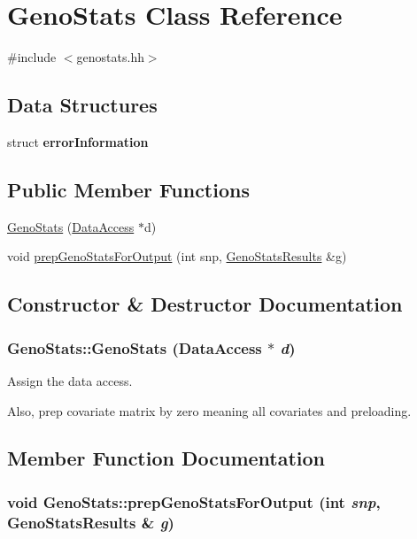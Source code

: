 \hypertarget{classGenoStats}{
\section{GenoStats Class Reference}
\label{classGenoStats}
}


{\ttfamily \#include $<$genostats.hh$>$}

\subsection*{Data Structures}
\begin{DoxyCompactItemize}
\item 
struct {\bfseries errorInformation}
\end{DoxyCompactItemize}
\subsection*{Public Member Functions}
\begin{DoxyCompactItemize}
\item 
\hyperlink{classGenoStats_abda44be89005d401040006d35244931a}{GenoStats} (\hyperlink{classDataAccess}{DataAccess} $\ast$d)
\item 
void \hyperlink{classGenoStats_af40228967a3faba8c13349358f628592}{prepGenoStatsForOutput} (int snp, \hyperlink{structGenoStatsResults}{GenoStatsResults} \&g)
\end{DoxyCompactItemize}


\subsection{Constructor \& Destructor Documentation}
\hypertarget{classGenoStats_abda44be89005d401040006d35244931a}{
\subsubsection[{GenoStats}]{\setlength{\rightskip}{0pt plus 5cm}GenoStats::GenoStats ({\bf DataAccess} $\ast$ {\em d})}}
\label{classGenoStats_abda44be89005d401040006d35244931a}
Assign the data access.

Also, prep covariate matrix by zero meaning all covariates and preloading. 

\subsection{Member Function Documentation}
\hypertarget{classGenoStats_af40228967a3faba8c13349358f628592}{
\subsubsection[{prepGenoStatsForOutput}]{\setlength{\rightskip}{0pt plus 5cm}void GenoStats::prepGenoStatsForOutput (int {\em snp}, \/  {\bf GenoStatsResults} \& {\em g})}}
\label{classGenoStats_af40228967a3faba8c13349358f628592}


